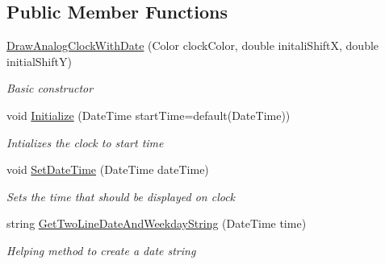 \subsection*{Public Member Functions}
\begin{DoxyCompactItemize}
\item 
\hyperlink{class_w_p_f_visualization_base_1_1_draw_analog_clock_with_date_acec045ad25c29510e4da053bb9d36ed6}{Draw\+Analog\+Clock\+With\+Date} (Color clock\+Color, double initali\+ShiftX, double initial\+ShiftY)
\begin{DoxyCompactList}\small\item\em Basic constructor \end{DoxyCompactList}\item 
void \hyperlink{class_w_p_f_visualization_base_1_1_draw_analog_clock_with_date_afd18780a5cbcbf63984aea165e05e7be}{Initialize} (Date\+Time start\+Time=default(Date\+Time))
\begin{DoxyCompactList}\small\item\em Intializes the clock to start time \end{DoxyCompactList}\item 
void \hyperlink{class_w_p_f_visualization_base_1_1_draw_analog_clock_with_date_ab17429c9e6fe84fcc5f714ac8d7d14f0}{Set\+Date\+Time} (Date\+Time date\+Time)
\begin{DoxyCompactList}\small\item\em Sets the time that should be displayed on clock \end{DoxyCompactList}\item 
string \hyperlink{class_w_p_f_visualization_base_1_1_draw_analog_clock_with_date_a06ff67dfff8ad1b82867fdd435200fa4}{Get\+Two\+Line\+Date\+And\+Weekday\+String} (Date\+Time time)
\begin{DoxyCompactList}\small\item\em Helping method to create a date string \end{DoxyCompactList}\end{DoxyCompactItemize}
